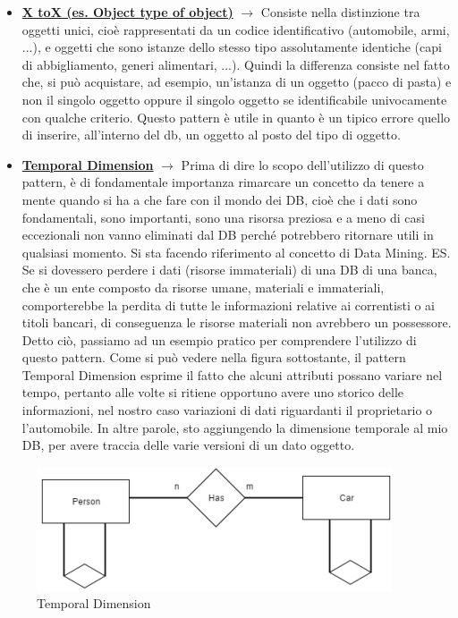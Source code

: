 \begin{itemize}

\item{\textbf{\underline{X toX (es. Object type of object)}}} $\rightarrow$ Consiste nella distinzione tra oggetti unici, cioè rappresentati da un codice identificativo (automobile, armi, ...), e oggetti che sono istanze dello stesso tipo assolutamente identiche (capi di abbigliamento, generi alimentari, ...). Quindi la differenza consiste nel fatto che, si può acquistare, ad esempio, un’istanza di un oggetto (pacco di pasta) e non il singolo oggetto oppure il singolo oggetto se identificabile univocamente con qualche criterio. 
Questo pattern è utile in quanto è un tipico errore quello di inserire, all’interno del db, un oggetto al posto del tipo di oggetto.

\item{\textbf{\underline{Temporal Dimension}}} $\rightarrow$ Prima di dire lo scopo dell’utilizzo di questo pattern, è di fondamentale importanza rimarcare un concetto da tenere a mente quando si ha a che fare con il mondo dei DB, cioè che i dati sono fondamentali, sono importanti, sono una risorsa preziosa e a meno di casi eccezionali non vanno eliminati dal DB perché potrebbero ritornare utili in qualsiasi momento. Si sta facendo riferimento al concetto di Data Mining. ES. Se si dovessero perdere i dati (risorse immateriali) di una DB di una banca, che è un ente composto da risorse umane, materiali e immateriali, comporterebbe la perdita di tutte le informazioni relative ai correntisti o ai titoli bancari, di conseguenza le risorse materiali non avrebbero un possessore.  
Detto ciò, passiamo ad un esempio pratico per comprendere l’utilizzo di questo pattern.  Come si può vedere nella figura sottostante, il pattern Temporal Dimension esprime il fatto che alcuni attributi possano variare nel tempo, pertanto alle volte si ritiene opportuno avere uno storico delle informazioni, nel nostro caso variazioni di dati riguardanti il proprietario o 
l’automobile. In altre parole, sto aggiungendo la dimensione temporale al mio DB, per avere traccia delle varie versioni di un dato oggetto.   

\end{itemize}

\begin{center}
\begin{figure}[H]
\centering
\includegraphics[scale=1]{figures/tdim.png}
\caption{Temporal Dimension} 
\end{figure}
\end{center}

